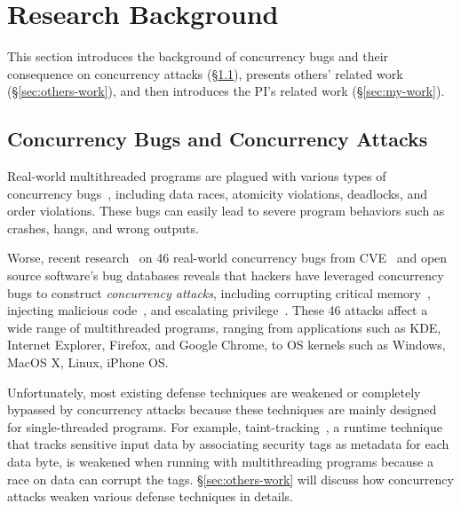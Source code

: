 
\vspace{-.15in}\section{Research Background} \label{sec:related}\vspace{-.075in}

This section introduces the background of concurrency bugs and 
their consequence on concurrency attacks (\S\ref{sec:background}), 
presents others' related work (\S\ref{sec:others-work}), and then introduces 
the PI's related work (\S\ref{sec:my-work}).

\vspace{-.15in}\subsection{Concurrency Bugs and Concurrency Attacks} 
\label{sec:background}\vspace{-.075in}

Real-world multithreaded programs are plagued with various types of concurrency 
bugs~\cite{lu:concurrency-bugs}, including data races, atomicity violations, 
deadlocks, and order violations. These bugs can easily lead to severe program 
behaviors such as crashes, hangs, and wrong outputs.



Worse, recent research~\cite{con:hotpar12} on 46 real-world concurrency bugs 
from CVE~\cite{cve-races} and open source software's bug databases reveals 
that hackers have leveraged concurrency bugs to construct \emph{concurrency 
attacks}, including corrupting critical memory~\cite{apache-bug-25520}, 
injecting malicious code~\cite{libsafe:bug}, and escalating 
privilege~\cite{uselib-bug-12791}. These 46 attacks affect a wide range of 
multithreaded programs, ranging from applications such as KDE, Internet 
Explorer, Firefox, and Google Chrome, to OS kernels such as Windows, MacOS X, 
Linux, iPhone OS.

Unfortunately, most existing defense techniques are weakened or completely 
bypassed by concurrency attacks because these techniques are mainly designed 
for single-threaded programs. For example, 
taint-tracking~\cite{taintdroid:osdi10, lift:micro06, myers:information, 
valgrind:pldi}, a runtime technique that tracks sensitive input data by 
associating security tags as metadata for each data byte, is weakened when running with 
multithreading programs because a race on data can corrupt the tags. \S\ref{sec:others-work} 
will discuss how concurrency attacks weaken various defense techniques in 
details.

